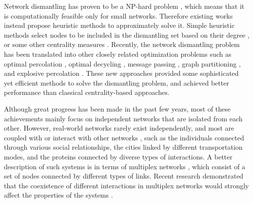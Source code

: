 \documentclass[%
 aip,
 cha,
 amsmath,amssymb,
 reprint,%
]{revtex4-1}
\begin{document}
Network dismantling has proven to be a NP-hard problem \cite{Braunstein12368}, which means that it is computationally feasible only for small networks. Therefore existing works instead propose heuristic methods to approximately solve it. Simple heuristic methods select nodes to be included in the dismantling set based on their degree \cite{albert2000error,PhysRevLett.85.5468,cohen2001breakdown}, or some other centrality measures \cite{LU20161}. Recently, the network dismantling problem has been translated into other closely related optimization problems such as optimal percolation \cite{Morone2015}, optimal decycling \cite{Braunstein12368,PhysRevE.94.012305,Zdeborova2016}, message passing \cite{PhysRevX.4.021024}, graph partitioning \cite{PhysRevLett.101.058701,Ren6554}, and explosive percolation \cite{clusella2016immunization}. These new approaches provided some sophisticated yet efficient methods to solve the dismantling problem, and achieved better performance than classical centrality-based approaches.



Although great progress has been made in the past few years, most of these achievements mainly focus on independent networks that are isolated from each other. However, real-world networks rarely exist independently, and most are coupled with or interact with other networks \cite{Buldyrev2010}, such as the individuals connected through various social relationships, the cities linked by different transportation modes, and the proteins connected by diverse types of interactions. A better description of such systems is in terms of multiplex networks \cite{BOCCALETTI20141,PhysRevX.3.041022,Lee2015,doi:10.1063/1.4953595}, which consist of a set of nodes connected by different types of links. Recent research demonstrated that the coexistence of different interactions in multiplex networks would strongly affect the properties of the systems \cite{PhysRevLett.111.128701,PhysRevE.89.042811}.
\end{document}

